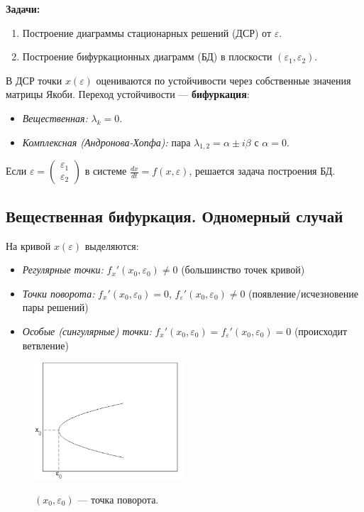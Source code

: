 	\textbf{Задачи:}
	\begin{enumerate}
		\item Построение диаграммы стационарных решений (ДСР) от \(\varepsilon\).
		\item Построение бифуркационных диаграмм (БД) в плоскости \((\varepsilon_1, \varepsilon_2)\).
	\end{enumerate}
	
	В ДСР точки \(x(\varepsilon)\) оцениваются по устойчивости через собственные значения матрицы Якоби. 
	\newline
	Переход устойчивости — \textbf{бифуркация}:
	\begin{itemize}
		\item \textit{Вещественная:} \(\lambda_k = 0\).
		\item \textit{Комплексная (Андронова-Хопфа):} пара \(\lambda_{1,2} = \alpha \pm i\beta\) с \(\alpha = 0\).
	\end{itemize}
	
	Если \(\varepsilon = \begin{pmatrix} \varepsilon_1 \\ \varepsilon_2 \end{pmatrix}\) в системе \(\frac{d x}{d t} = f(x, \varepsilon)\), решается задача построения БД.
	
	\subsection{Вещественная бифуркация. Одномерный случай}
	
	На кривой \(x(\varepsilon)\) выделяются:
	\begin{itemize}
		\item \textit{Регулярные точки:} \( f_x'(x_0, \varepsilon_0) \neq 0 \) (большинство точек кривой)
		\item \textit{Точки поворота:} \( f_x'(x_0, \varepsilon_0) = 0 \), \( f_\varepsilon'(x_0, \varepsilon_0) \neq 0 \) (появление/исчезновение пары решений)
		\item \textit{Особые (сингулярные) точки:} \( f_x'(x_0, \varepsilon_0) = f_\varepsilon'(x_0, \varepsilon_0) = 0 \) (происходит ветвление)
	\end{itemize}
	
	\begin{figure}[H]
		\centering
		\includegraphics[width=0.5\textwidth]{img/10_01}
		\par
		{\small\((x_0, \varepsilon_0)\) — точка поворота.}
		\label{fig:10_01}
	\end{figure}
	
